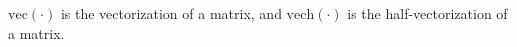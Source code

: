 \noindent
$
\mathrm{vec}
\left(
\cdot
\right)
$
is the vectorization of a matrix,
and
$
\mathrm{vech} 
\left( 
\cdot 
\right)
$
is the half-vectorization of a matrix.
